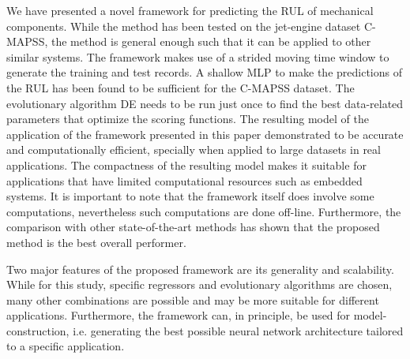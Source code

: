 \documentclass[preprint,12pt]{elsarticle}%
\begin{document}
We have presented a novel framework for predicting the RUL of mechanical
components. While the method has been tested on the jet-engine dataset
C-MAPSS, the method is general enough such that it can be applied to other similar
systems. The framework makes use of a strided moving time window to generate
the training and test records. A shallow MLP to make the predictions of the RUL
has been found to be sufficient for the C-MAPSS dataset. The evolutionary
algorithm DE needs to be run just once to find the best data-related
parameters that optimize the scoring functions. The resulting model of the application of the framework presented in this
paper demonstrated to be accurate and computationally
efficient, specially when applied to large datasets in real applications. The compactness of the resulting model makes it suitable for applications that have
limited computational resources such as embedded systems. It is important to note that the framework itself does involve some computations, nevertheless such computations are done off-line. Furthermore, the
comparison with other state-of-the-art methods has shown that the proposed
method is the best overall performer.

Two major features of the proposed framework are its generality and
scalability. While for this study, specific regressors and evolutionary
algorithms are chosen, many other combinations are possible and may be more
suitable for different applications. Furthermore, the framework can, in
principle, be used for model-construction, i.e. generating the best possible
neural network architecture tailored to a specific application.



%

%


\clearpage


\onecolumn%


\bigskip%
\end{document}
